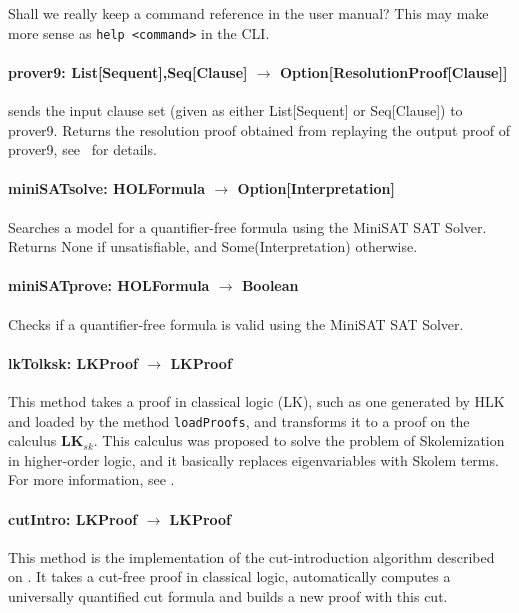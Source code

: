 \documentclass[a4paper,11pt]{article}
\newenvironment{meta}{\color{red}}{\color{black}}
\begin{document}
\begin{appendix}
\begin{meta}
Shall we really keep a command reference in the user manual? This may make more sense
as \texttt{help <command>} in the CLI.
\end{meta}

\paragraph{\textbf{prover9: List[Sequent],Seq[Clause] $\rightarrow$ Option[ResolutionProof[Clause]]}}
sends the input clause set (given as either List[Sequent] or Seq[Clause]) to prover9. Returns
the resolution proof obtained from replaying the output proof of prover9,
see~\cite{Dunchev12System} for details.

\paragraph{\textbf{miniSATsolve: HOLFormula $\rightarrow$ Option[Interpretation]}}
Searches a model for a quantifier-free formula using the MiniSAT SAT Solver.
Returns None if unsatisfiable, and Some(Interpretation) otherwise.

\paragraph{\textbf{miniSATprove: HOLFormula $\rightarrow$ Boolean}}
Checks if a quantifier-free formula is valid using the MiniSAT SAT Solver.

\paragraph{\textbf{lkTolksk: LKProof $\rightarrow$ LKProof}}
This method takes a proof in classical logic (LK), such as one generated by HLK and 
loaded by the method \texttt{loadProofs}, and transforms it to a proof on the
calculus $\mathbf{LK}_{sk}$. This calculus was proposed to solve the problem of
Skolemization in higher-order logic, and it basically replaces eigenvariables
with Skolem terms. For more information, see \cite{Hetzl11CERES}.

\paragraph{\textbf{cutIntro: LKProof $\rightarrow$ LKProof}}
This method is the implementation of the cut-introduction algorithm described on
\cite{Hetzl2012}. It takes a cut-free proof in classical logic, automatically
computes a universally quantified cut formula and builds a new proof with this
cut.


\end{appendix}
\end{document}
